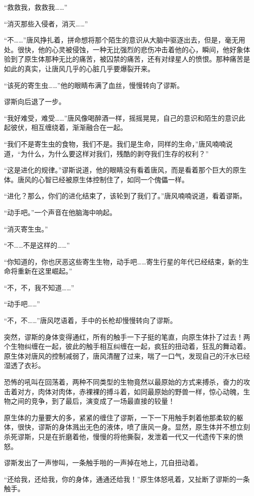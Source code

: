 “救救我，救救我……”

“消灭那些入侵者，消灭……”

“不……”唐风挣扎着，拼命想将那个陌生的意识从大脑中驱逐出去，但是，毫无用处。很快，他的心灵被侵蚀，一种无比强烈的悲伤冲击着他的心，瞬间，他好象体验到了原生体那种无比的痛苦，被囚禁的痛苦，还有对绿星人的愤恨。那种痛苦是如此的真实，让唐风几乎的心脏几乎要爆裂开来。

“该死的寄生虫……”他的眼睛布满了血丝，慢慢转向了谬斯。

谬斯向后退了一步。

“我好难受，难受……”唐风像喝醉酒一样，摇摇晃晃，自己的意识和陌生的意识此起彼伏，相互缠绕着，渐渐融合在一起。

“我们不是寄生虫的食物，我们不是。我们是生命，同样的生命，”唐风喃喃说道，“为什么，为什么要这样对我们，残酷的剥夺我们生存的权利？”

“这是进化的规律。”谬斯说道，他的眼睛没有看着唐风，而是看着那个巨大的原生体。唐风的心智已经被原生体控制住了，如同一个傀儡一样。

“进化？那么，你们的进化结束了，该轮到了我们了。”唐风喃喃说道，看着谬斯。

“动手吧。”一个声音在他脑海中响起。

“消灭寄生虫。”

“不……不是这样的……”

“你知道的，你也厌恶这些寄生生物，动手吧……寄生行星的年代已经结束，新的生命将重新在这里崛起。”

“不，不，我不知道……”

“动手吧……”

“不，不……”唐风呓语着，手中的长枪却慢慢转向了谬斯。

突然，谬斯的身体变得通红，所有的触手一下子挺的笔直，向原生体扑了过去！两个生物纠缠在一起，彼此的触手相互纠缠在一起，疯狂的扭动着，狂乱的舞动着。原生体对唐风的控制减弱了，唐风清醒了过来，喘了一口气，发现自己的汗水已经湿透了衣衫。

恐怖的吼叫在回荡着，两种不同类型的生物竟然以最原始的方式来搏杀，奋力的攻击着对方，肉体对肉体，赤裸裸的搏斗着，如同最原始的野兽一样，惊心动魄，生物之间的竞争，到了最后，演变成了一场最直接的较量！

原生体的力量要大的多，紧紧的缠住了谬斯，一下一下用触手刺着他那柔软的躯体，很快，谬斯的身体溅出无色的液体，喷了唐风一身。显然，原生体并不想立刻杀死谬斯，只是在折磨着他，慢慢的将他撕裂，发泄着一代又一代遗传下来的愤怒。

谬斯发出了一声惨叫，一条触手啪的一声掉在地上，兀自扭动着。

“还给我，还给我，你的身体，通通还给我！”原生体怒吼着，又扯断了谬斯的一条触手。

